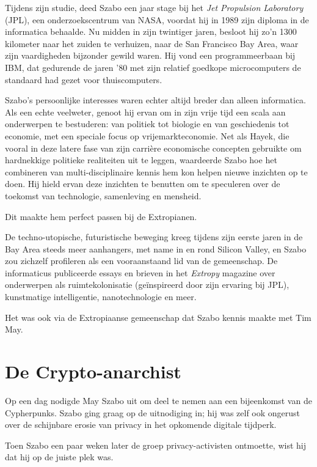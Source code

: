 \documentclass[
  a5paper,
  smalldemyvopaper,11pt,twoside,onecolumn,openright,extrafontsizes,
hidelinks]{memoir}
\begin{document}
Tijdens zijn studie, deed Szabo een jaar stage bij het \emph{Jet
Propulsion Laboratory} (JPL), een onderzoekscentrum van NASA, voordat
hij in 1989 zijn diploma in de informatica behaalde. Nu midden in zijn
twintiger jaren, besloot hij zo'n 1300 kilometer naar het zuiden te
verhuizen, naar de San Francisco Bay Area, waar zijn vaardigheden
bijzonder gewild waren. Hij vond een programmeerbaan bij IBM, dat
gedurende de jaren '80 met zijn relatief goedkope microcomputers de
standaard had gezet voor thuiscomputers.

Szabo's persoonlijke interesses waren echter altijd breder dan alleen
informatica. Als een echte veelweter, genoot hij ervan om in zijn vrije
tijd een scala aan onderwerpen te bestuderen: van politiek tot biologie
en van geschiedenis tot economie, met een speciale focus op
vrijemarkteconomie. Net als Hayek, die vooral in deze latere fase van
zijn carrière economische concepten gebruikte om hardnekkige politieke
realiteiten uit te leggen, waardeerde Szabo hoe het combineren van
multi-disciplinaire kennis hem kon helpen nieuwe inzichten op te doen.
Hij hield ervan deze inzichten te benutten om te speculeren over de
toekomst van technologie, samenleving en mensheid.

Dit maakte hem perfect passen bij de Extropianen.

De techno-utopische, futuristische beweging kreeg tijdens zijn eerste
jaren in de Bay Area steeds meer aanhangers, met name in en rond Silicon
Valley, en Szabo zou zichzelf profileren als een vooraanstaand lid van
de gemeenschap. De informaticus publiceerde essays en brieven in het
\emph{Extropy} magazine over onderwerpen als ruimtekolonisatie
(geïnspireerd door zijn ervaring bij JPL), kunstmatige intelligentie,
nanotechnologie en meer.

Het was ook via de Extropiaanse gemeenschap dat Szabo kennis maakte met
Tim May.

\section{De Crypto-anarchist}\label{de-crypto-anarchist}

Op een dag nodigde May Szabo uit om deel te nemen aan een bijeenkomst
van de Cypherpunks. Szabo ging graag op de uitnodiging in; hij was zelf
ook ongerust over de schijnbare erosie van privacy in het opkomende
digitale tijdperk.

Toen Szabo een paar weken later de groep privacy-activisten ontmoette,
wist hij dat hij op de juiste plek was.
\end{document}
